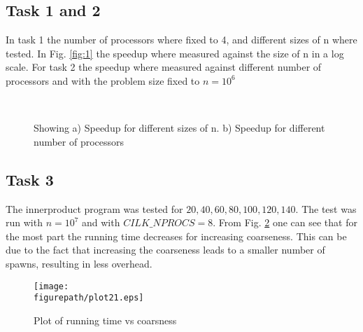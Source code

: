  \newcommand{\figurepath}{./figures/}
\newcommand{\figurescale}{0.5}
\newcommand{\codepath}{../matlab/}


\subsection*{Task 1 and 2}

In task 1 the number of processors where fixed to 4, and different sizes of n where tested. In Fig. \ref{fig:1} the speedup where measured against the size of n in a log scale. For task 2 the speedup where measured against different number of processors and with the problem size fixed to $n=10^6$

\begin{figure}[h!] 
 \center 
  \\
 \caption{ Showing a) Speedup for different sizes of n. b) Speedup for different number of processors \label{fig:}}
 \end{figure}


\clearpage

\subsection*{Task 3}

The innerproduct program was tested for $ 20 , 40 , 60, 80, 100, 120, 140 $. The test was run with $n=10^7$ and with $CILK\_NPROCS=8$. From Fig. \ref{fig:co} one can see that for the most part the running time decreases for increasing coarseness. This can be due to the fact that increasing the coarseness leads to a smaller number of spawns, resulting in less overhead.


\begin{figure}[h!] 
 \center 
 \texttt{[image: \\figurepath/plot21.eps]}
 \caption{ Plot of running time vs coarsness \label{fig:co}}
 \end{figure}

 

